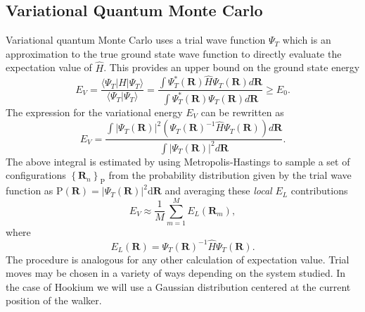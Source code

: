 \documentclass[final,3p,times,twocolumn]{elsarticle}
\begin{document}
	\subsection{Variational Quantum Monte Carlo}
	Variational quantum Monte Carlo uses a trial wave function $\Psi_{T}$ which is an approximation to the true ground state wave function to directly evaluate the expectation value of $\hat H$. This provides an upper bound on the ground state energy
	\begin{equation}
		\label{eq:variational_princ}
		E_{V}=\frac{\langle \Psi_{T} | H | \Psi_{T} \rangle}{\langle \Psi_{T} | \Psi_{T} \rangle}
		=\frac{\int \Psi_{T}^{*}(\mathbf{R}) \hat{H} \Psi_{T}(\mathbf{R}) d \mathbf{R}}{\int \Psi_{T}^{*}(\mathbf{R}) \Psi_{T}(\mathbf{R}) d \mathbf{R}} \geq E_{0}.
	\end{equation}
	The expression for the variational energy $E_V$ can be rewritten as
	\begin{equation}
		\label{eq:E_V}
		E_{V}=\frac{\int\left|\Psi_{T}(\mathbf{R})\right|^{2}\left(\Psi_{T}(\mathbf{R})^{-1} \hat{H} \Psi_{T}(\mathbf{R})\right) d \mathbf{R}}{\int\left|\Psi_{T}(\mathbf{R})\right|^{2} d \mathbf{R}}.
	\end{equation}
	The above integral is estimated by using Metropolis-Hastings to sample a set of configurations $\left\{ \mathbf{R}_n \right\}_{\mathrm{P}}$ from the probability distribution given by the trial wave function as $\mathrm{P}(\mathbf{R}) = |\Psi_T(\mathbf{R})|^2 \mathrm{d}\mathbf{R}$ and averaging these \emph{local} $E_L$ contributions
	\begin{equation}
		E_{V} \approx \frac{1}{M} \sum_{m=1}^{M} E_{L}\left(\mathbf{R}_{m}\right),
	\end{equation}
	where
	\begin{equation}
		E_{L}(\mathbf{R})=\Psi_{T}(\mathbf{R})^{-1} \hat{H} \Psi_{T}(\mathbf{R}).
	\end{equation}
	The procedure is analogous for any other calculation of expectation value. Trial moves may be chosen in a variety of ways depending on the system studied. In the case of Hookium we will use a Gaussian distribution centered at the current position of the walker.
	
\end{document}
